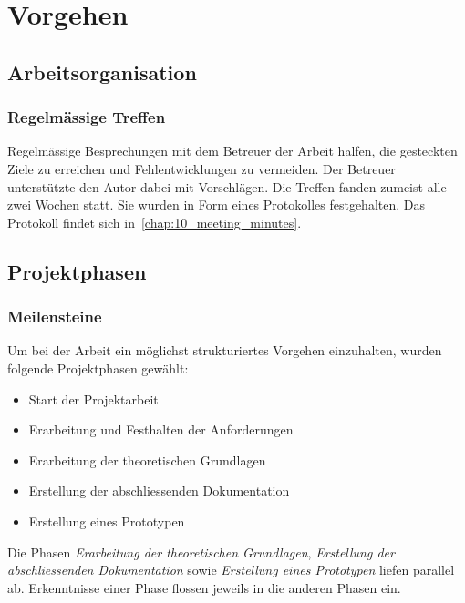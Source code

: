 
\chapter{Vorgehen}
\label{chap:procedure}

\section{Arbeitsorganisation}
\label{sec:organization}

\subsection{Regelmässige Treffen}
\label{subsec:meetings}

Regelmässige Besprechungen mit dem Betreuer der Arbeit halfen, die
gesteckten Ziele zu erreichen und Fehlentwicklungen zu vermeiden. Der
Betreuer unterstützte den Autor dabei mit Vorschlägen. Die Treffen
fanden zumeist alle zwei Wochen statt. Sie wurden in Form eines
Protokolles festgehalten. Das Protokoll findet sich in~\autoref{chap:10_meeting_minutes}.

\section{Projektphasen}
\label{sec:project_schedule}

\subsection{Meilensteine}
\label{subsec:milestones}

Um bei der Arbeit ein möglichst strukturiertes Vorgehen einzuhalten,
wurden folgende Projektphasen gewählt:
\begin{itemize}
    \item Start der Projektarbeit
    \item Erarbeitung und Festhalten der Anforderungen
    \item Erarbeitung der theoretischen Grundlagen
    \item Erstellung der abschliessenden Dokumentation
    \item Erstellung eines Prototypen
\end{itemize}

Die Phasen \textit{Erarbeitung der theoretischen Grundlagen}, \textit{Erstellung
der abschliessenden Dokumentation} sowie \textit{Erstellung eines
Prototypen} liefen parallel ab. Erkenntnisse einer Phase flossen jeweils in die
anderen Phasen ein.

